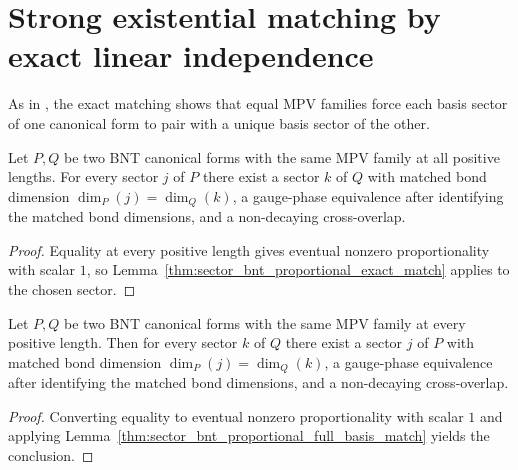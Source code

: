\section{Strong existential matching by exact linear independence}
\label{sec:sector_bnt_strong_match}

As in \cite[Appendix~A]{Cirac2016MPDO_arXiv}, the exact matching shows that
equal MPV families force each basis sector of one canonical form to pair with
a unique basis sector of the other.

\begin{lemma}
    \label{thm:sector_bnt_exact_block_match}
    \leanok
    Let $P, Q$ be two BNT canonical forms with the same MPV family at all
    positive lengths. For every sector $j$ of $P$ there exist a sector $k$ of
    $Q$ with matched bond dimension $\dim_P(j) = \dim_Q(k)$, a gauge-phase
    equivalence after identifying the matched bond dimensions, and a
    non-decaying cross-overlap.
\end{lemma}

\begin{proof}\leanok
    Equality at every positive length gives eventual nonzero proportionality
    with scalar $1$, so
    Lemma~\ref{thm:sector_bnt_proportional_exact_match} applies to the chosen
    sector.
\end{proof}

\begin{lemma}
    \label{thm:sector_bnt_forall_unit_k_exists_j_nondecaying_overlap_of_sameMPV}
    \leanok
    Let $P, Q$ be two BNT canonical forms with the same MPV family at every
    positive length. Then for every sector $k$ of $Q$ there exist a sector $j$
    of $P$ with matched bond dimension $\dim_P(j) = \dim_Q(k)$, a gauge-phase
    equivalence after identifying the matched bond dimensions, and a
    non-decaying cross-overlap.
\end{lemma}

\begin{proof}\leanok
    Converting equality to eventual nonzero proportionality with scalar $1$ and
    applying Lemma~\ref{thm:sector_bnt_proportional_full_basis_match} yields
    the conclusion.
\end{proof}

